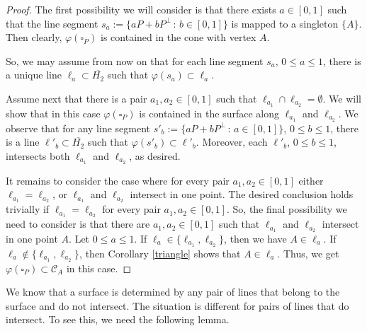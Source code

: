 \documentclass[10pt,a4paper]{amsart}
\newcommand\cC{{\mathcal{C}}}
\newcommand\oH{{\overline{H_2}}}
\theoremstyle{definition}
\theoremstyle{remark}
\numberwithin{subsection}{section}
\numberwithin{equation}{section}
\begin{document}
\begin{proof}
The first possibility we will consider is that there exists $a\in [0,1]$ such that the line segment $s_a := \{ aP + bP^\perp \, : \, b \in [0,1] \}$ is mapped to a singleton $\{ A \}$. Then clearly, $\varphi ({\square}_P)$ is contained in the cone with vertex $A$.

So, we may assume from now on that for each line segment $s_a$, $0 \le a \le 1$, there is a unique line $\ell_a \subset \oH$ such that $\varphi (s_a) \subset \ell_a$.

Assume next that there is a pair $a_1 , a_2 \in [0,1]$ such that $\ell_{a_1} \cap \ell_{a_2} =\emptyset$. We will show that in this case $\varphi ({\square}_P)$ is contained in the surface along $\ell_{a_1}$ and $\ell_{a_2}$. 
We observe that for any line segment $s'_b := \{ aP + bP^\perp \, : \, a \in [0,1] \}$, $0 \le b \le 1$, there is a line $\ell'_b \subset \oH$ such that $\varphi (s'_b) \subset \ell'_b$. Moreover, each $\ell'_b$, $0 \le b \le 1$, intersects both $\ell_{a_1}$ and $\ell_{a_2}$, as desired.

It remains to consider the case where for every pair $a_1 , a_2 \in [0,1]$ either $\ell_{a_1} = \ell_{a_2}$, or $\ell_{a_1}$ and $\ell_{a_2}$ intersect in one point. 
The desired conclusion holds trivially if $\ell_{a_1} = \ell_{a_2}$ for every pair $a_1 , a_2 \in [0,1]$. 
So, the final possibility we need to consider is that there are $a_1 , a_2 \in [0,1]$ such that  $\ell_{a_1}$ and $\ell_{a_2}$ intersect in one point $A$.
Let $0 \le a \le 1$. 
If $\ell_{a}\in\{\ell_{a_1}, \ell_{a_2}\}$, then we have $A\in \ell_a$. 
If $\ell_{a}\notin\{\ell_{a_1}, \ell_{a_2}\}$, then Corollary \ref{triangle} shows that $A\in \ell_a$. 
Thus, we get $\varphi ({\square}_P)\subset \cC_A$ in this case.
\end{proof}


We know that a surface is determined by any pair of lines that belong to the surface and do not intersect. The situation is different for pairs of lines that do intersect. 
To see this, we need the following lemma. 
\end{document}
